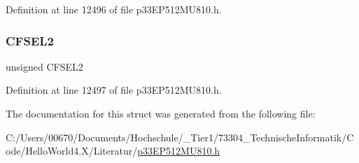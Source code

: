 Definition at line 12496 of file p33\+E\+P512\+M\+U810.\+h.

\mbox{\label{structtag_c_m2_f_l_t_r_b_i_t_s_a136e38e2a181ec59b7952e0a8e019fc4}} 
\subsubsection{\texorpdfstring{C\+F\+S\+E\+L2}{CFSEL2}}
{\footnotesize\ttfamily unsigned C\+F\+S\+E\+L2}



Definition at line 12497 of file p33\+E\+P512\+M\+U810.\+h.



The documentation for this struct was generated from the following file\+:\begin{DoxyCompactItemize}
\item 
C\+:/\+Users/00670/\+Documents/\+Hochschule/\+\_\+\+Tier1/73304\+\_\+\+Technische\+Informatik/\+Code/\+Hello\+World4.\+X/\+Literatur/\hyperlink{p33_e_p512_m_u810_8h}{p33\+E\+P512\+M\+U810.\+h}\end{DoxyCompactItemize}
